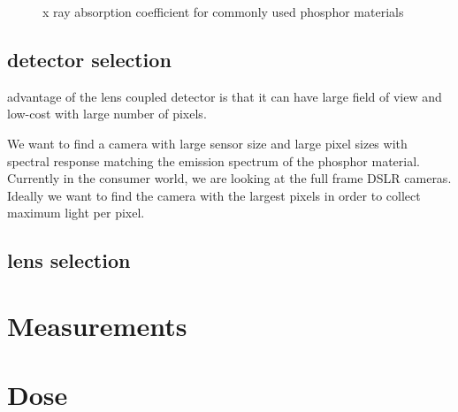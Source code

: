 \begin{figure}
\centering
{}
\caption{x ray absorption coefficient for commonly used phosphor materials}
\label{fig:absorptioncoeff}
\end{figure}


\subsection{detector selection}
advantage of the lens coupled detector is that it can have large field of view and low-cost with large number of pixels.

We want to find a camera with large sensor size and large pixel sizes with spectral response matching the emission spectrum of the phosphor material.  Currently in the consumer world, we are looking at the full frame DSLR cameras.  Ideally we want to find the camera with the largest pixels in order to collect maximum light per pixel.







\subsection{lens selection}

\section{Measurements}

\section{Dose}